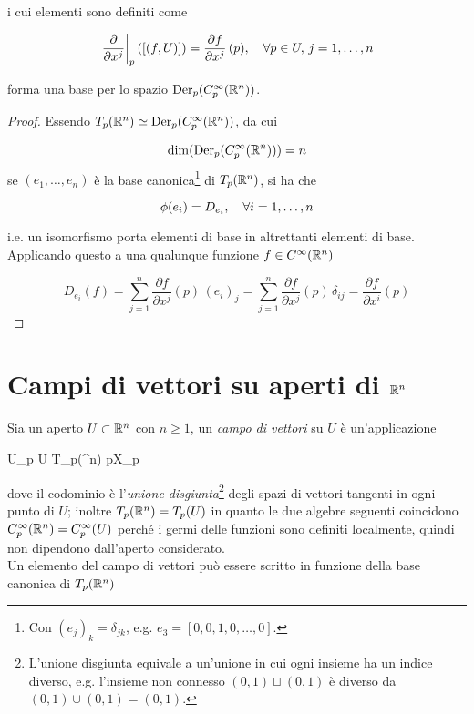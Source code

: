 i cui elementi sono definiti come

\begin{equation}
	\eval{ \pdv{x^{j}} }_{p} ([(f,U)]) = \pdv{f}{x^{j}} \, (p) \qcomma \forall p \in U, \, j = 1, \dots, n
\end{equation}

forma una base per lo spazio $ \operatorname{Der}_{p}(C_{p}^{\infty}(\mathbb{R}^{n})) $.

\begin{proof}
	Essendo $ T_{p}(\mathbb{R}^{n}) \simeq \operatorname{Der}_{p}(C_{p}^{\infty}(\mathbb{R}^{n})) $, da cui
	
	\begin{equation}
		\dim ( \operatorname{Der}_{p}(C_{p}^{\infty}(\mathbb{R}^{n})) ) = n
	\end{equation}
	se $ (e_{1},\dots,e_{n}) $ è la base canonica\footnote{%
		Con $ (e_{j})_{k} = \delta_{jk} $, e.g. $ e_{3} = [0,0,1,0,\dots,0] $.%
	} di $ T_{p}(\mathbb{R}^{n}) $, si ha che

	\begin{equation}
		\phi(e_{i}) = D_{e_{i}} \qcomma \forall i=1,\dots,n
	\end{equation}

	i.e. un isomorfismo porta elementi di base in altrettanti elementi di base.\\
	Applicando questo a una qualunque funzione $ f \in C^{\infty} (\mathbb{R}^{n}) $
	
	\begin{equation}
		D_{e_{i}} (f) = \sum_{j=1}^{n} \dfrac{\partial f}{\partial x^{j}} (p) \, (e_{i})_{j} = \sum_{j=1}^{n} \dfrac{\partial f}{\partial x^{j}} (p) \, \delta_{ij} = \dfrac{\partial f}{\partial x^{i}} (p)
	\end{equation}
\end{proof}

\section{Campi di vettori su aperti di $ \mathbb{R}^{n} $}

Sia un aperto $ U \subset \mathbb{R}^{n} $ con $ n \geqslant 1 $, un \textit{campo di vettori} su $ U $ è un'applicazione

	{U}{\bigsqcup_{p \in U} T_{p}(\R^{n})}
	{p}{X_{p}}

dove il codominio è l'\textit{unione disgiunta}\footnote{%
	L'unione disgiunta equivale a un'unione in cui ogni insieme ha un indice diverso, e.g. l'insieme non connesso $ (0,1) \sqcup (0,1) $ è diverso da $ (0,1) \cup (0,1) = (0,1) $.%
} degli spazi di vettori tangenti in ogni punto di $ U $; inoltre $ T_{p}(\mathbb{R}^{n}) = T_{p}(U) $ in quanto le due algebre seguenti coincidono $ C_{p}^{\infty}(\mathbb{R}^{n}) = C_{p}^{\infty}(U) $ perché i germi delle funzioni sono definiti localmente, quindi non dipendono dall'aperto considerato.\\
Un elemento del campo di vettori può essere scritto in funzione della base canonica di $ T_{p}(\mathbb{R}^{n}) $

